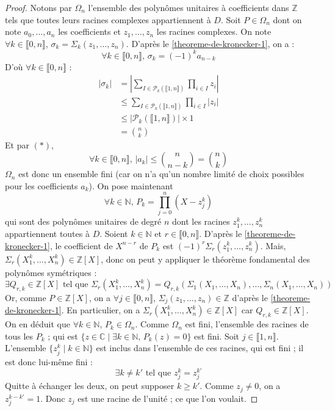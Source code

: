  \begin{proof}
    Notons par $\Omega_n$ l'ensemble des polynômes unitaires à coefficients dans $\mathbb{Z}$ tels que toutes leurs racines complexes appartiennent à $D$. Soit $P \in \Omega_n$ dont on note $a_0, \dots, a_n$ les coefficients et $z_1, \dots, z_n$ les racines complexes. On note $\forall k \in \llbracket 0, n \rrbracket$, $\sigma_k = \Sigma_k(z_1, \dots, z_n)$. D'après le \cref{theoreme-de-kronecker-1}, on a :
    \[ \forall k \in \llbracket 0, n \rrbracket, \, \sigma_k = (-1)^k a_{n-k} \tag{$*$} \]
    D'où $\forall k \in \llbracket 0, n \rrbracket$ :
    \begin{align*}
      |\sigma_k| &= \left| \sum_{I \in \mathcal{P}_k(\llbracket 1, n \rrbracket)} \prod_{i \in I} z_i \right| \\
      &\leq \sum_{I \in \mathcal{P}_k(\llbracket 1, n \rrbracket)} \prod_{i \in I} |z_i| \\
      &\leq |\mathcal{P}_k(\llbracket 1, n \rrbracket)| \times 1 \\
      &= \binom{n}{k}
    \end{align*}
    Et par $(*)$,
    \[ \forall k \in \llbracket 0, n \rrbracket, \, |a_k| \leq \binom{n}{n-k} = \binom{n}{k} \]
    $\Omega_n$ est donc un ensemble fini (car on n'a qu'un nombre limité de choix possibles pour les coefficients $a_k$).
    \newpar
    On pose maintenant
    \[ \forall k \in \mathbb{N}, \, P_k = \prod_{j=0}^n (X-z_j^k) \]
    qui sont des polynômes unitaires de degré $n$ dont les racines $z_1^k, \dots, z_n^k$ appartiennent toutes à $D$. Soient $k \in \mathbb{N}$ et $r \in \llbracket 0, n \rrbracket$. D'après le \cref{theoreme-de-kronecker-1}, le coefficient de $X^{n-r}$ de $P_k$ est $(-1)^r \Sigma_r(z_1^k, \dots, z_n^k)$. Mais, $\Sigma_r(X_1^k, \dots, X_n^k) \in \mathbb{Z}[X]$, donc on peut y appliquer le théorème fondamental des polynômes symétriques :
    \[ \exists Q_{r,k} \in \mathbb{Z}[X] \text{ tel que } \Sigma_r(X_1^k, \dots, X_n^k) = Q_{r,k}(\Sigma_1(X_1, \dots, X_n), \dots, \Sigma_n(X_1, \dots, X_n)) \]
    Or, comme $P \in \mathbb{Z}[X]$, on a $\forall j \in \llbracket 0, n \rrbracket$, $\Sigma_j(z_1, \dots, z_n) \in \mathbb{Z}$ d'après le \cref{theoreme-de-kronecker-1}. En particulier, on a $\Sigma_r(X_1^k, \dots, X_n^k) \in \mathbb{Z}[X]$ car $Q_{r,k} \in \mathbb{Z}[X]$. On en déduit que $\forall k \in \mathbb{N}$, $P_k \in \Omega_n$.
    \newpar
    Comme $\Omega_n$ est fini, l'ensemble des racines de tous les $P_k$ ; qui est $\{ z \in \mathbb{C} \mid \exists k \in \mathbb{N}, \, P_k(z) = 0 \}$ est fini. Soit $j \in \llbracket 1, n \rrbracket$. L'ensemble $\{ z_j^k \mid k \in \mathbb{N} \}$ est inclus dans l'ensemble de ces racines, qui est fini ; il est donc lui-même fini :
    \[ \exists k \neq k' \text{ tel que } z_j^k = z_j^{k'} \]
    Quitte à échanger les deux, on peut supposer $k \geq k'$. Comme $z_j \neq 0$, on a $z_j^{k-k'} = 1$. Donc $z_j$ est une racine de l'unité ; ce que l'on voulait.
  \end{proof}

